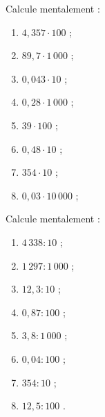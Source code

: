 \begin{exercice}
Calcule mentalement :
\begin{enumerate} 
 \item $4,357 \cdot 100$ \dotfill ; 
 
 \item $89,7 \cdot 1\,000$ \dotfill ; 
 
 \item $0,043 \cdot 10$ \dotfill ; 
 
 \item $0,28 \cdot 1\,000$ \dotfill ; 
 
 \item $39 \cdot 100$ \dotfill ; 
 
 \item $0,48 \cdot 10$ \dotfill ; 
 	
 \item $354 \cdot 10$ \dotfill ; 
 	
 \item $0,03 \cdot 10\,000$ \dotfill ; 
 
 \end{enumerate}
\end{exercice}


\begin{exercice}
Calcule mentalement :
\begin{enumerate} 
 \item $4\,338 : 10$ \dotfill ; 
 
 \item $1\,297 : 1\,000$ \dotfill ; 
 	
 \item $12,3 : 10$ \dotfill ; 
 
 \item $0,87 : 100$ \dotfill ; 
 	
 \item $3,8 : 1\,000$ \dotfill ; 
 
 \item $0,04 : 100$ \dotfill ; 
 	
 \item $354 : 10$ \dotfill ; 
 
 \item $12,5 : 100$ \dotfill. 
 
 \end{enumerate}
\end{exercice}



